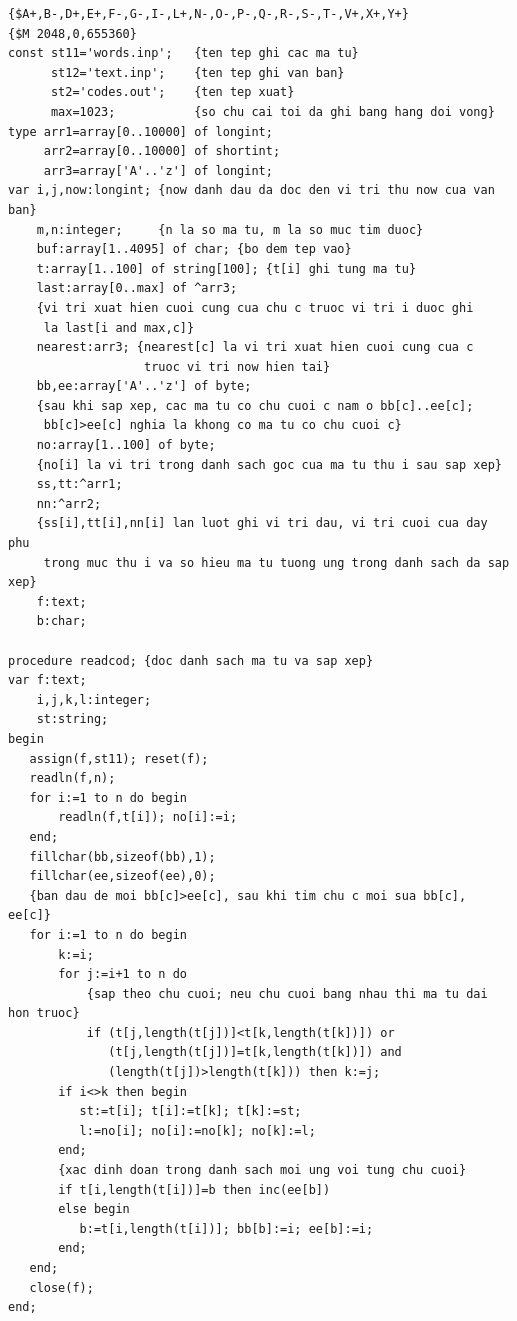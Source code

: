 \documentclass[11pt]{article}
\begin{document}
\begin{verbatim}
{$A+,B-,D+,E+,F-,G-,I-,L+,N-,O-,P-,Q-,R-,S-,T-,V+,X+,Y+}
{$M 2048,0,655360}
const st11='words.inp';   {ten tep ghi cac ma tu}
      st12='text.inp';    {ten tep ghi van ban}
      st2='codes.out';    {ten tep xuat}
      max=1023;           {so chu cai toi da ghi bang hang doi vong}
type arr1=array[0..10000] of longint;
     arr2=array[0..10000] of shortint;
     arr3=array['A'..'z'] of longint;
var i,j,now:longint; {now danh dau da doc den vi tri thu now cua van ban}
    m,n:integer;     {n la so ma tu, m la so muc tim duoc}
    buf:array[1..4095] of char; {bo dem tep vao}
    t:array[1..100] of string[100]; {t[i] ghi tung ma tu}
    last:array[0..max] of ^arr3;
    {vi tri xuat hien cuoi cung cua chu c truoc vi tri i duoc ghi
     la last[i and max,c]}
    nearest:arr3; {nearest[c] la vi tri xuat hien cuoi cung cua c
                   truoc vi tri now hien tai}
    bb,ee:array['A'..'z'] of byte;
    {sau khi sap xep, cac ma tu co chu cuoi c nam o bb[c]..ee[c];
     bb[c]>ee[c] nghia la khong co ma tu co chu cuoi c}
    no:array[1..100] of byte;
    {no[i] la vi tri trong danh sach goc cua ma tu thu i sau sap xep}
    ss,tt:^arr1;
    nn:^arr2;
    {ss[i],tt[i],nn[i] lan luot ghi vi tri dau, vi tri cuoi cua day phu
     trong muc thu i va so hieu ma tu tuong ung trong danh sach da sap xep}
    f:text;
    b:char;

procedure readcod; {doc danh sach ma tu va sap xep}
var f:text;
    i,j,k,l:integer;
    st:string;
begin
   assign(f,st11); reset(f);
   readln(f,n);
   for i:=1 to n do begin
       readln(f,t[i]); no[i]:=i;
   end;
   fillchar(bb,sizeof(bb),1);
   fillchar(ee,sizeof(ee),0);
   {ban dau de moi bb[c]>ee[c], sau khi tim chu c moi sua bb[c], ee[c]}
   for i:=1 to n do begin
       k:=i;
       for j:=i+1 to n do
           {sap theo chu cuoi; neu chu cuoi bang nhau thi ma tu dai hon truoc}
           if (t[j,length(t[j])]<t[k,length(t[k])]) or
              (t[j,length(t[j])]=t[k,length(t[k])]) and
              (length(t[j])>length(t[k])) then k:=j;
       if i<>k then begin
          st:=t[i]; t[i]:=t[k]; t[k]:=st;
          l:=no[i]; no[i]:=no[k]; no[k]:=l;
       end;
       {xac dinh doan trong danh sach moi ung voi tung chu cuoi}
       if t[i,length(t[i])]=b then inc(ee[b])
       else begin
          b:=t[i,length(t[i])]; bb[b]:=i; ee[b]:=i;
       end;
   end;
   close(f);
end;


\end{verbatim}
\end{document}
